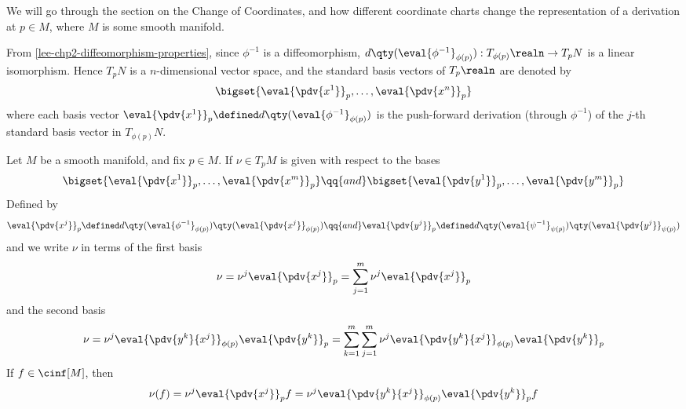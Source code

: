 \documentclass[../main-v2-manifolds.tex]{subfiles}
\begin{document}
We will go through the section on the Change of Coordinates, and how different coordinate charts change the representation of a derivation at $p\in M$, where $M$ is some smooth  manifold.
\begin{definition}
    From \cref{lee-chp2-diffeomorphism-properties}, since $\phi^{-1}$ is a diffeomorphism, $d\qty(\eval{\phi^{-1}}_{\phi(p)}): T_{\phi(p)}\realn\to T_p N$ is a linear isomorphism. Hence $T_p N$ is a $n$-dimensional vector space, and the standard basis vectors of $T_p\realn$ are denoted by
    \begin{equation}
        \bigset{\eval{\pdv{x^1}}_p,\ldots,\eval{\pdv{x^n}}_p}
    \end{equation}
    where each basis vector $\eval{\pdv{x^1}}_p\defined d\qty(\eval{\phi^{-1}}_{\phi(p)})$ is the push-forward derivation (through $\phi^{-1}$) of the $j$-th standard basis vector in $T_{\phi(p)}N$.
\end{definition}
\begin{wts}
    Let $M$ be a smooth manifold, and fix $p\in M$. If $\nu\in T_pM$ is given with respect to the bases
    \[
        \bigset{\eval{\pdv{x^1}}_{p},\ldots,\eval{\pdv{x^m}}_{p}}\qq{and}\bigset{\eval{\pdv{y^1}}_p,\ldots,\eval{\pdv{y^m}}_{p}}
    \]
    Defined by 
    \[\eval{\pdv{x^j}}_{p}\defined d\qty(\eval{\phi^{-1}}_{\phi(p)})\qty(\eval{\pdv{x^j}}_{\phi(p)})
    \qq{and}
    \eval{\pdv{y^j}}_{p}\defined d\qty(\eval{\psi^{-1}}_{\psi(p)})\qty(\eval{\pdv{y^j}}_{\psi(p)})\]
    and we write $\nu$ in terms of the first basis
    \[
        \nu = \nu^j\eval{\pdv{x^j}}_{p} = \sum_{j=1}^m \nu^j\eval{\pdv{x^j}}_{p}
    \]
    and the second basis
    \[
        \nu = \nu^j\eval{\pdv{y^k}{x^j}}_{\phi(p)}\eval{\pdv{y^k}}_{p} = \sum_{k=1}^m\sum_{j=1}^m \nu^j\eval{\pdv{y^k}{x^j}}_{\phi(p)}\eval{\pdv{y^k}}_p
    \]
    If $f\in \cinf[M]$, then 
    \[
        \nu(f) = \nu^j\eval{\pdv{x^j}}_{p} f =\nu^j\eval{\pdv{y^k}{x^j}}_{\phi(p)}\eval{\pdv{y^k}}_{p} f
    \]
\end{wts}
\end{document}
